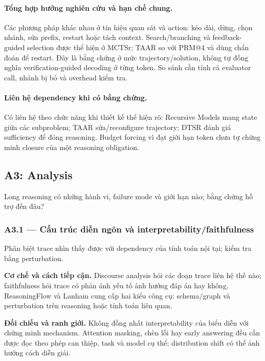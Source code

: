 \paragraph{Tổng hợp hướng nghiên cứu và hạn chế chung.}
Các phương pháp khác nhau ở tín hiệu quan sát và action: kéo dài, dừng, chọn nhánh, sửa prefix, restart hoặc tách context. Search/branching và feedback-guided selection được thể hiện ở MCTSr; TAAR so với PRM@4 và dùng chẩn đoán để restart. Đây là bằng chứng ở mức trajectory/solution, không tự đồng nghĩa verification-guided decoding ở từng token. So sánh cần tính cả evaluator call, nhánh bị bỏ và overhead kiểm tra.

\paragraph{Liên hệ dependency khi có bằng chứng.}
Có liên hệ theo chức năng khi thiết kế thể hiện rõ: Recursive Models mang state giữa các subproblem; TAAR sửa/reconfigure trajectory; DTSR đánh giá sufficiency để đóng reasoning. Budget forcing vì đạt giới hạn token chưa tự chứng minh closure của một reasoning obligation.

\subsection{A3: Analysis}
\label{subsec:a3_review}

Long reasoning có những hành vi, failure mode và giới hạn nào; bằng chứng hỗ trợ đến đâu?

\subsubsection*{A3.1 — Cấu trúc diễn ngôn và interpretability/faithfulness}
Phân biệt trace nhìn thấy được với dependency của tính toán nội tại; kiểm tra bằng perturbation.

\noindent\textbf{Cơ chế và cách tiếp cận.} Discourse analysis hỏi các đoạn trace liên hệ thế nào; faithfulness hỏi trace có phản ánh yếu tố ảnh hưởng đáp án hay không. ReasoningFlow và Lanham cung cấp hai kiểu công cụ: schema/graph và perturbation trên reasoning hoặc tính toán liên quan.\par
\noindent\textbf{Đối chiếu và ranh giới.} Không đồng nhất interpretability của biểu diễn với chứng minh mechanism. Attention masking, chèn lỗi hay early answering đều cần được đọc theo phép can thiệp, task và model cụ thể; distribution shift có thể ảnh hưởng cách diễn giải.\par

